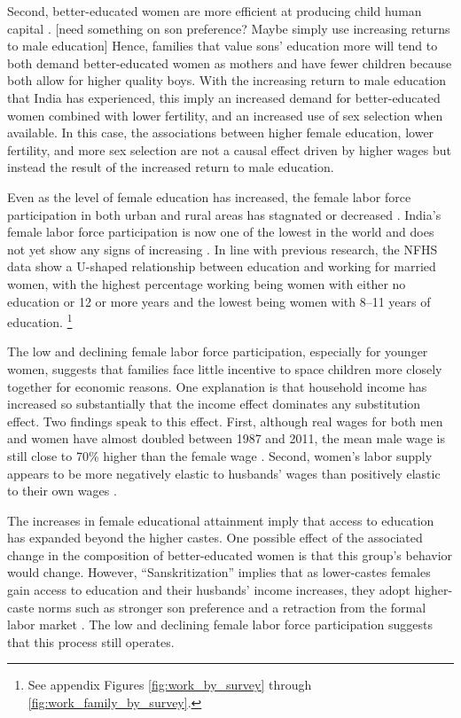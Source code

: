 Second, better-educated women are more efficient at producing child human capital 
\citep{Behrman1999}.
[need something on son preference? Maybe simply use increasing returns to male education]
Hence, families that value sons' education more will tend to both demand better-educated
women as mothers and have fewer children because both allow for higher quality boys.
With the increasing return to male education that India has experienced, this imply
an increased demand for better-educated women combined with lower fertility, and an 
increased use of sex selection when available.
In this case, the associations between higher female education, lower fertility, and more
sex selection are not a causal effect driven by higher wages but instead the result of the 
increased return to male education. 

Even as the level of female education has increased, the female labor force 
participation in both urban and rural areas has stagnated or decreased
\citep{Klasen2015,Fletcher2017,Afridi2018,Bhargava2018,Chatterjee2018,Bhargava2019}.
India's female labor force participation is now one of the lowest in the world  
and does not yet show any signs of increasing \citep{Klasen2015,Chatterjee2018}.
In line with previous research, the NFHS data show a U-shaped relationship between 
education and working for married women, with the highest percentage working being women 
with either no education or 12 or more years and the lowest being women with 8--11 years 
of education.%
\footnote{
See appendix Figures \ref{fig:work_by_survey} through \ref{fig:work_family_by_survey}. 
}

The low and declining female labor force participation, especially for younger women, 
suggests that families face little incentive to space children more closely 
together for economic reasons.
One explanation is that household income has increased so substantially that the income 
effect dominates any substitution effect.
Two findings speak to this effect.
First, although real wages for both men and women have almost doubled between 1987 and 
2011, the mean male wage is still close to 70\% higher than the female wage 
\citep{Klasen2015,Bhargava2018}.
Second, women’s labor supply appears to be more negatively elastic to husbands' 
wages than positively elastic to their own wages \citep{Bhargava2018}.


The increases in female educational attainment imply that access to education has 
expanded beyond the higher castes. 
One possible effect of the associated change in the composition of better-educated women 
is that this group's behavior would change.
However, ``Sanskritization'' implies that as lower-castes females gain access to 
education and their husbands' income increases, they adopt higher-caste 
norms such as stronger son preference and a retraction from the formal labor 
market \citep{Srinivas1956,Chen1995,Abraham2013,Chatterjee2018}.
The low and declining female labor force participation suggests that this process still operates.

